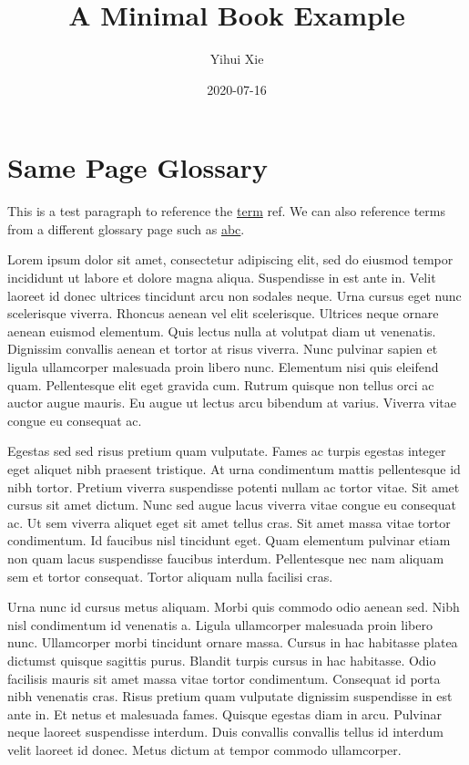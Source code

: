 \documentclass[
]{book}
\title{A Minimal Book Example}
\author{Yihui Xie}
\date{2020-07-16}
\begin{document}
\maketitle

{
\setcounter{tocdepth}{1}
\tableofcontents
}
\hypertarget{same-page-glossary}{%
\chapter*{Same Page Glossary}\label{same-page-glossary}}

This is a test paragraph to reference the \protect\hyperlink{term}{term} ref. We can also reference terms from a different glossary page such as \protect\hyperlink{abc}{abc}.

Lorem ipsum dolor sit amet, consectetur adipiscing elit, sed do eiusmod tempor incididunt ut labore et dolore magna aliqua. Suspendisse in est ante in. Velit laoreet id donec ultrices tincidunt arcu non sodales neque. Urna cursus eget nunc scelerisque viverra. Rhoncus aenean vel elit scelerisque. Ultrices neque ornare aenean euismod elementum. Quis lectus nulla at volutpat diam ut venenatis. Dignissim convallis aenean et tortor at risus viverra. Nunc pulvinar sapien et ligula ullamcorper malesuada proin libero nunc. Elementum nisi quis eleifend quam. Pellentesque elit eget gravida cum. Rutrum quisque non tellus orci ac auctor augue mauris. Eu augue ut lectus arcu bibendum at varius. Viverra vitae congue eu consequat ac.

Egestas sed sed risus pretium quam vulputate. Fames ac turpis egestas integer eget aliquet nibh praesent tristique. At urna condimentum mattis pellentesque id nibh tortor. Pretium viverra suspendisse potenti nullam ac tortor vitae. Sit amet cursus sit amet dictum. Nunc sed augue lacus viverra vitae congue eu consequat ac. Ut sem viverra aliquet eget sit amet tellus cras. Sit amet massa vitae tortor condimentum. Id faucibus nisl tincidunt eget. Quam elementum pulvinar etiam non quam lacus suspendisse faucibus interdum. Pellentesque nec nam aliquam sem et tortor consequat. Tortor aliquam nulla facilisi cras.

Urna nunc id cursus metus aliquam. Morbi quis commodo odio aenean sed. Nibh nisl condimentum id venenatis a. Ligula ullamcorper malesuada proin libero nunc. Ullamcorper morbi tincidunt ornare massa. Cursus in hac habitasse platea dictumst quisque sagittis purus. Blandit turpis cursus in hac habitasse. Odio facilisis mauris sit amet massa vitae tortor condimentum. Consequat id porta nibh venenatis cras. Risus pretium quam vulputate dignissim suspendisse in est ante in. Et netus et malesuada fames. Quisque egestas diam in arcu. Pulvinar neque laoreet suspendisse interdum. Duis convallis convallis tellus id interdum velit laoreet id donec. Metus dictum at tempor commodo ullamcorper.
\end{document}
